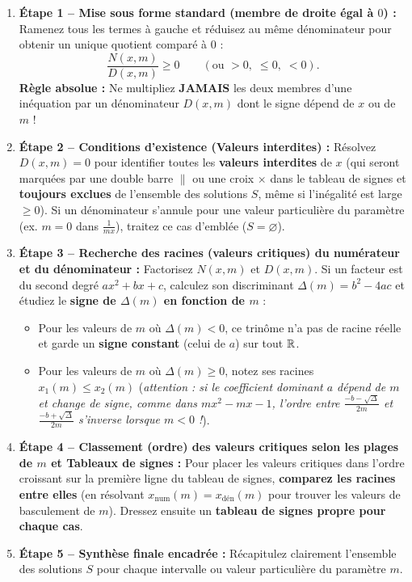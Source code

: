\begin{theoreme}
\begin{enumerate}
    \item \textbf{Étape 1 -- Mise sous forme standard (membre de droite égal à $0$) :}
    Ramenez tous les termes à gauche et réduisez au même dénominateur pour obtenir un unique quotient comparé à $0$ :
    \[
        \boxed{\frac{N(x, m)}{D(x, m)} \ge 0 \qquad \left(\text{ou } > 0,\; \le 0,\; < 0\right)}.
    \]
    \textbf{Règle absolue :} Ne multipliez \textbf{JAMAIS} les deux membres d'une inéquation par un dénominateur $D(x,m)$ dont le signe dépend de $x$ ou de $m$ !
    \item \textbf{Étape 2 -- Conditions d'existence (Valeurs interdites) :}
    Résolvez $D(x, m) = 0$ pour identifier toutes les \textbf{valeurs interdites} de $x$ (qui seront marquées par une double barre $\|$ ou une croix $\times$ dans le tableau de signes et \textbf{toujours exclues} de l'ensemble des solutions $S$, même si l'inégalité est large $\ge 0$). Si un dénominateur s'annule pour une valeur particulière du paramètre (ex. $m = 0$ dans $\frac{1}{mx}$), traitez ce cas d'emblée ($S = \varnothing$).
    \item \textbf{Étape 3 -- Recherche des racines (valeurs critiques) du numérateur et du dénominateur :}
    Factorisez $N(x,m)$ et $D(x,m)$. Si un facteur est du second degré $ax^2 + bx + c$, calculez son discriminant $\Delta(m) = b^2 - 4ac$ et étudiez le \textbf{signe de $\Delta(m)$ en fonction de $m$} :
    \begin{itemize}
        \item Pour les valeurs de $m$ où $\Delta(m) < 0$, ce trinôme n'a pas de racine réelle et garde un \textbf{signe constant} (celui de $a$) sur tout $\mathbb{R}$.
        \item Pour les valeurs de $m$ où $\Delta(m) \ge 0$, notez ses racines $x_1(m) \le x_2(m)$ (\emph{attention : si le coefficient dominant $a$ dépend de $m$ et change de signe, comme dans $mx^2 - mx - 1$, l'ordre entre $\frac{-b-\sqrt{\Delta}}{2m}$ et $\frac{-b+\sqrt{\Delta}}{2m}$ s'inverse lorsque $m < 0$ !}).
    \end{itemize}
    \item \textbf{Étape 4 -- Classement (ordre) des valeurs critiques selon les plages de $m$ et Tableaux de signes :}
    Pour placer les valeurs critiques dans l'ordre croissant sur la première ligne du tableau de signes, \textbf{comparez les racines entre elles} (en résolvant $x_{\text{num}}(m) = x_{\text{dén}}(m)$ pour trouver les valeurs de basculement de $m$). Dressez ensuite un \textbf{tableau de signes propre pour chaque cas}.
    \item \textbf{Étape 5 -- Synthèse finale encadrée :}
    Récapitulez clairement l'ensemble des solutions $S$ pour chaque intervalle ou valeur particulière du paramètre $m$.
\end{enumerate}
\end{theoreme}

